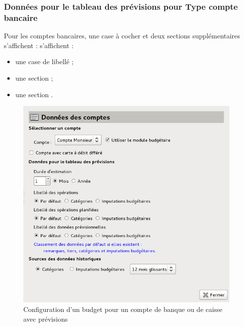 \subsubsection{Données pour le tableau des prévisions pour Type compte bancaire\label{setup-budget-data-bank}}

Pour les comptes bancaires, une case à cocher et deux sections supplémentaires \ifIllustration s'affichent :
\else s'affichent : 
\fi

\begin{itemize}
	\item une case de libellé  ; 
	\item une section  ;
	\item une section .
\end{itemize}

\ifIllustration
\begin{figure}[ht]
\begin{center}
\includegraphics[scale=0.5]{image/screenshot/setup_budget_dataBank}
\end{center}
\caption{Configuration d'un budget pour un compte de banque ou de caisse avec prévisions}
\label{setup_budget_dataBank-img}
\end{figure}
\fi

